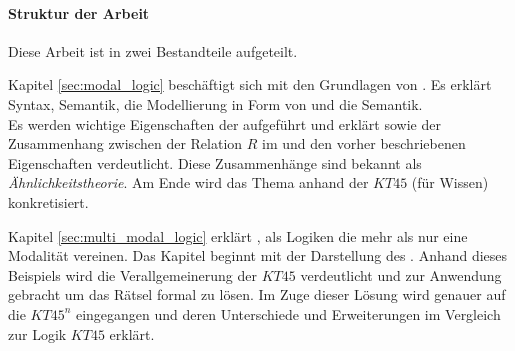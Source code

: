 
\paragraph{Struktur der Arbeit} %
\label{par:struktur_der_arbeit}

Diese Arbeit ist in zwei Bestandteile aufgeteilt. 

Kapitel \ref{sec:modal_logic} beschäftigt sich mit den Grundlagen von \ML. 
Es erklärt Syntax, Semantik, die Modellierung in Form von \KSn und die \PW Semantik.\\
Es werden wichtige Eigenschaften der \ML aufgeführt und erklärt sowie der Zusammenhang zwischen der Relation $R$ im \KM und den vorher beschriebenen Eigenschaften verdeutlicht. 
Diese Zusammenhänge sind bekannt als \emph{Ähnlichkeitstheorie}.
Am Ende wird das Thema anhand der \ML $KT45$ (für Wissen) konkretisiert.

Kapitel \ref{sec:multi_modal_logic} erklärt \MMLn, als Logiken die mehr als nur eine Modalität vereinen.
Das Kapitel beginnt mit der Darstellung des \WMR. 
Anhand dieses Beispiels wird die Verallgemeinerung der \ML $KT45$ verdeutlicht und zur Anwendung gebracht um das Rätsel formal zu lösen.
Im Zuge dieser Lösung wird genauer auf die \MML $KT45^n$ eingegangen und deren Unterschiede und Erweiterungen im Vergleich zur Logik $KT45$ erklärt.






